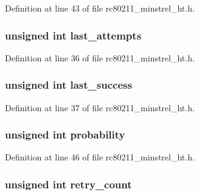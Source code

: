 Definition at line 43 of file rc80211\-\_\-minstrel\-\_\-ht.\-h.

\hypertarget{structminstrel__rate__stats_a5a57031309e6917d037f074015ebf051}{
\subsubsection[{last\-\_\-attempts}]{\setlength{\rightskip}{0pt plus 5cm}unsigned int last\-\_\-attempts}}\label{structminstrel__rate__stats_a5a57031309e6917d037f074015ebf051}


Definition at line 36 of file rc80211\-\_\-minstrel\-\_\-ht.\-h.

\hypertarget{structminstrel__rate__stats_a759724fa6afe27569c1f129ff4708e47}{
\subsubsection[{last\-\_\-success}]{\setlength{\rightskip}{0pt plus 5cm}unsigned int last\-\_\-success}}\label{structminstrel__rate__stats_a759724fa6afe27569c1f129ff4708e47}


Definition at line 37 of file rc80211\-\_\-minstrel\-\_\-ht.\-h.

\hypertarget{structminstrel__rate__stats_a68975779708d4e8687d8f500cd1e2e61}{
\subsubsection[{probability}]{\setlength{\rightskip}{0pt plus 5cm}unsigned int probability}}\label{structminstrel__rate__stats_a68975779708d4e8687d8f500cd1e2e61}


Definition at line 46 of file rc80211\-\_\-minstrel\-\_\-ht.\-h.

\hypertarget{structminstrel__rate__stats_aa01b3f9d6a9f63eb01422e4783c64f09}{
\subsubsection[{retry\-\_\-count}]{\setlength{\rightskip}{0pt plus 5cm}unsigned int retry\-\_\-count}}\label{structminstrel__rate__stats_aa01b3f9d6a9f63eb01422e4783c64f09}


